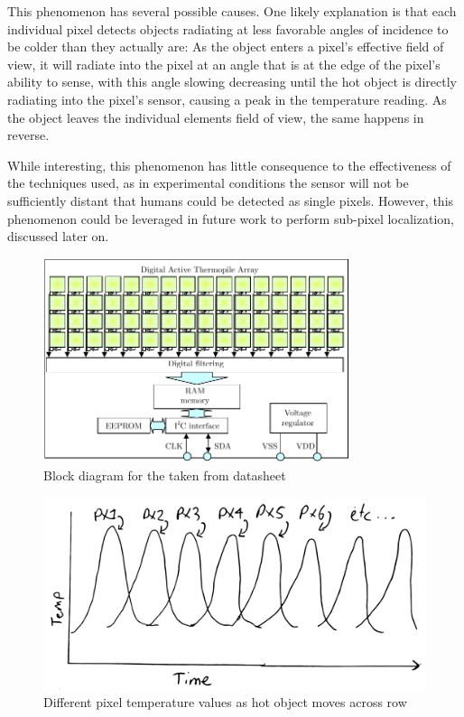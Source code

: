 \documentclass[../thesis/thesis.tex]{subfiles}
\begin{document}
This phenomenon has several possible causes. One likely explanation is that each individual pixel detects objects radiating at less favorable angles of incidence to be colder than they actually are: As the object enters a pixel's effective field of view, it will radiate into the pixel at an angle that is at the edge of the pixel's ability to sense, with this angle slowing decreasing until the hot object is directly radiating into the pixel's sensor, causing a peak in the temperature reading. As the object leaves the individual elements field of view, the same happens in reverse.

While interesting, this phenomenon has little consequence to the effectiveness of the techniques used, as in experimental conditions the sensor will not be sufficiently distant that humans could be detected as single pixels. However, this phenomenon could be leveraged in future work to perform sub-pixel localization, discussed later on.


\begin{figure}
\centering
\includegraphics[width=0.8\textwidth]{../diagrams/mlx-block-diagram.pdf}
\caption{Block diagram for the \mlx taken from datasheet \cite{MLXDatasheet}}
\label{fig:exps:blockdia}
\end{figure}

\begin{figure}
\centering
\includegraphics[width=\textwidth]{../diagrams/temp/motion.pdf}
\caption{Different \mlx pixel temperature values as hot object moves across row}
\label{fig:hotmotion}
\end{figure}
\end{document}
